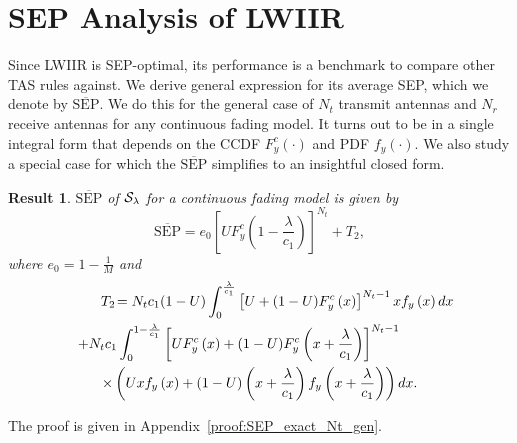 \documentclass[12pt,draftcls,peerreview,onecolumn]{IEEEtran}
\newtheorem{result}{{\bf Result}}
\newcommand{\tendsto}{\to}
\newcommand{\SEP}{\text{SEP}}
\newcommand{\lam}{\lambda}
\newcommand{\mug}{{\mu_{g}}}
\newcommand{\termtwo}{T_2}
\newcommand{\Nt}{{N_t}}
\newcommand{\Nr}{{N_r}}
\newcommand{\Pt}{{P_t}}
\newcommand{\outmax}{O_{\text{max}}}
\newcommand{\itau}{\tau}
\newcommand{\cone}{c_{1}}
\newcommand{\lambym}{\frac{\lam}{\cone}}
\newcommand{\un}{U}
\newcommand{\zerosep}{e_0}
\newcommand{\callamrule}{{\cal S_{{\lam}}}}
\newcommand{\avgSEP}{\overline{\SEP}}
\newcommand{\pdfyNrgen}[1]{f_{y}\left(#1\right)} %
\newcommand{\ccdfy}[1]{F^{c}_{y}\left(#1 \right)}
\newcommand{\unccdfygen}[2]{{#1} \ccdfy{#2}  }
\newcommand{\ccdfyrv}[1]{ F^{c}_{y}\left(#1 \right) }
\newcommand{\pdfy}[1]{ f_{y}\left( #1 \right) }
\begin{document}


\section{SEP Analysis of LWIIR}
\label{sec:SEPanalysis}
Since LWIIR is SEP-optimal, its performance is a benchmark to compare other TAS rules against. We derive general expression for its average SEP, which we denote by  $\avgSEP$. We do this for the general case of $\Nt$ transmit antennas and $\Nr$ receive antennas for any continuous fading model. It turns out to be in a single integral form that depends on the CCDF $\ccdfyrv{\cdot}$ and PDF $\pdfy{\cdot}$. We also study a special case for which the $\avgSEP$ simplifies to an insightful  closed form.  %
 

\begin{result}
\label{thm:SEP_exact_Nt_gen}
$\avgSEP$ of $\callamrule$ for a continuous fading model is given by
\begin{equation}
\label{eq:SEP_Nt_gen} 
\avgSEP= \zerosep\left[\unccdfygen{\un}{1-\lambym}\right]^{\Nt} + \termtwo,
\end{equation}
%
where $\zerosep=1-\frac{1}{M}$ and
\begin{multline}
\hspace{25pt}\termtwo \!= \Nt\cone(1-\un)\int_{0}^{\lambym} \left[\un + \unccdfygen{(1-\un)}{x}\right]^{\Nt-1} x\pdfyNrgen{x} dx\\
\hspace{-30pt}+ \Nt\cone \int_{0}^{1-\lambym}
\left[\unccdfygen{\un}{x} +\unccdfygen{(1-\un)}{x+\lambym}  \right]^{\Nt-1}\\
\times\left(\un x\pdfyNrgen{x} + (1-\un)\left(x + \lambym\right) \pdfyNrgen{x + \lambym}\right) dx.
\label{eq:termtwo_gen}
\end{multline}
%
\end{result}
%
\begin{IEEEproof}
The proof is given in Appendix~\ref{proof:SEP_exact_Nt_gen}.
\end{IEEEproof}
%
\end{document}
